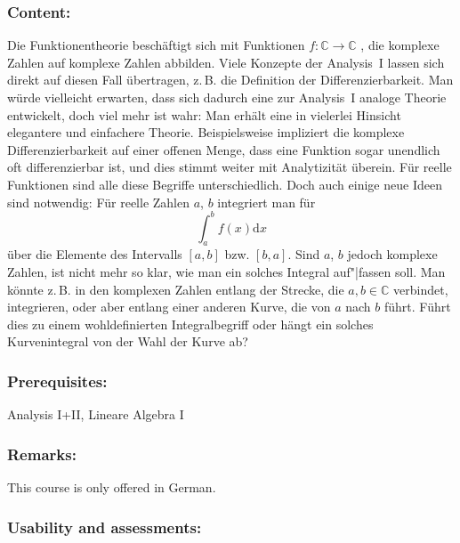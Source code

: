 \documentclass[a4paper,10pt]{article}
\begin{document}
\subsubsection*{\large
    Content:
}
Die Funktionentheorie beschäftigt sich mit Funktionen $f : \mathbb C \to \mathbb C$ , die komplexe Zahlen auf komplexe
Zahlen abbilden. Viele Konzepte der Analysis~I lassen sich direkt auf diesen Fall übertragen, z.\,B. die
Definition der Differenzierbarkeit. Man würde vielleicht erwarten, dass sich dadurch eine zur Analysis~I
analoge Theorie entwickelt, doch viel mehr ist wahr: Man erhält eine in vielerlei Hinsicht elegantere und
einfachere Theorie. Beispielsweise impliziert die komplexe Differenzierbarkeit auf einer offenen Menge, dass
eine Funktion sogar unendlich oft differenzierbar ist, und dies stimmt weiter mit Analytizität überein. Für
reelle Funktionen sind alle diese Begriffe unterschiedlich. Doch auch einige neue Ideen sind notwendig: Für
reelle Zahlen $a$, $b$ integriert man für
$$\int_a^b f(x) \mathrm dx$$
über die Elemente des Intervalls $[a, b]$ bzw. $[b, a]$. Sind $a$, $b$ jedoch komplexe Zahlen, ist nicht mehr so
klar, wie man ein solches Integral auf"|fassen soll. Man könnte z.\,B. in den komplexen Zahlen entlang der
Strecke, die $a, b \in \mathbb C$ verbindet, integrieren, oder aber entlang einer anderen Kurve, die von $a$ nach $b$ führt.
Führt dies zu einem wohldefinierten Integralbegriff oder hängt ein solches Kurvenintegral von der Wahl
der Kurve ab?
\subsubsection*{\large
    Prerequisites:
}
Analysis I+II, Lineare Algebra I
\subsubsection*{\large
    Remarks:
}
This course is only offered in German.
\subsubsection*{\large
    Usability and assessments:
}
\end{document}
